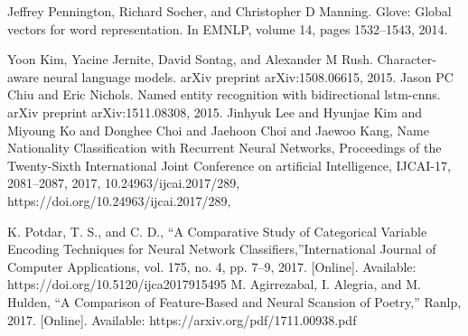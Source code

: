 \begin{thebibliography}{999}
 Jeffrey Pennington, Richard Socher, and Christopher D Manning. Glove: Global vectors for word representation. In EMNLP, volume 14, pages 1532–1543, 2014.

 Yoon Kim, Yacine Jernite, David Sontag, and Alexander M Rush. Character-aware neural language models. arXiv preprint arXiv:1508.06615, 2015.
 Jason PC Chiu and Eric Nichols. Named entity recognition with bidirectional lstm-cnns. arXiv preprint arXiv:1511.08308, 2015.
 Jinhyuk Lee and Hyunjae Kim and Miyoung Ko and Donghee Choi and Jaehoon Choi and Jaewoo Kang, Name Nationality Classification with Recurrent Neural Networks, Proceedings of the Twenty-Sixth International Joint Conference on artificial Intelligence, {IJCAI-17}, 2081--2087, 2017, 10.24963/ijcai.2017/289, https://doi.org/10.24963/ijcai.2017/289,

K. Potdar, T. S., and C. D., “A Comparative Study of Categorical Variable Encoding Techniques for Neural Network Classifiers,”International Journal of Computer Applications, vol. 175, no. 4, pp. 7–9, 2017. [Online]. Available: https://doi.org/10.5120/ijca2017915495
 M. Agirrezabal, I. Alegria, and M. Hulden, “A Comparison of Feature-Based and Neural Scansion of Poetry,” Ranlp, 2017. [Online]. Available: https://arxiv.org/pdf/1711.00938.pdf
  
\end{thebibliography}


%
%
%
%
\newpage


